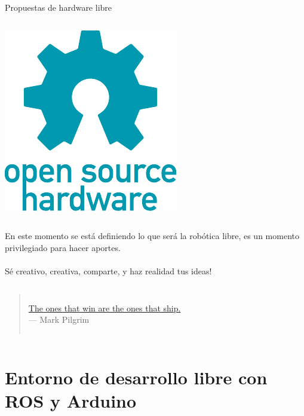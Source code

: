 \begin{frame}{Propuestas de hardware libre}
\begin{columns}
\begin{center}
          \includegraphics[width=.8\textwidth]{vendor/images/oshw-logo.pdf}
        \end{center}
    \end{columns}
  \end{frame}

  \begin{frame}
    \vfill
    En este momento se está definiendo lo que será la robótica libre, es un momento privilegiado para hacer aportes.\\~\\
    Sé creativo, creativa, comparte, y haz realidad tus ideas!
    \vfill\vfill
    \begin{columns}
        \begin{quote}
          \hfill{}\hspace{.3em}\small \href{http://diveintohtml5.info/past.html}{The ones that win are the ones that ship.}\normalsize\hspace{.5em}\\
          \hfill \small --- Mark Pilgrim \cite{pilgrim2010html5}\normalsize
        \end{quote}
    \end{columns}
  \end{frame}

\section{Entorno de desarrollo libre con ROS y Arduino}

